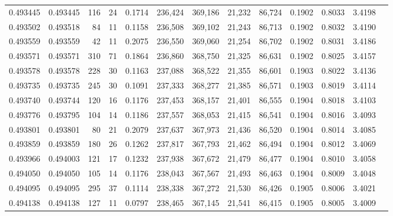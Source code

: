 \begin{tabular}{rrrrrrrrrrrrr}
0.493445 & 0.493445 &   116 &    24 &                                     0.1714 & 236,424 & 369,186 &  21,232 &  86,724 & 0.1902 & 0.8033 & 3.4198 \\
0.493502 & 0.493518 &    84 &    11 &                                     0.1158 & 236,508 & 369,102 &  21,243 &  86,713 & 0.1902 & 0.8032 & 3.4190 \\
0.493559 & 0.493559 &    42 &    11 &                                     0.2075 & 236,550 & 369,060 &  21,254 &  86,702 & 0.1902 & 0.8031 & 3.4186 \\
0.493571 & 0.493571 &   310 &    71 &                                     0.1864 & 236,860 & 368,750 &  21,325 &  86,631 & 0.1902 & 0.8025 & 3.4157 \\
0.493578 & 0.493578 &   228 &    30 &                                     0.1163 & 237,088 & 368,522 &  21,355 &  86,601 & 0.1903 & 0.8022 & 3.4136 \\
0.493735 & 0.493735 &   245 &    30 &                                     0.1091 & 237,333 & 368,277 &  21,385 &  86,571 & 0.1903 & 0.8019 & 3.4114 \\
0.493740 & 0.493744 &   120 &    16 &                                     0.1176 & 237,453 & 368,157 &  21,401 &  86,555 & 0.1904 & 0.8018 & 3.4103 \\
0.493776 & 0.493795 &   104 &    14 &                                     0.1186 & 237,557 & 368,053 &  21,415 &  86,541 & 0.1904 & 0.8016 & 3.4093 \\
0.493801 & 0.493801 &    80 &    21 &                                     0.2079 & 237,637 & 367,973 &  21,436 &  86,520 & 0.1904 & 0.8014 & 3.4085 \\
0.493859 & 0.493859 &   180 &    26 &                                     0.1262 & 237,817 & 367,793 &  21,462 &  86,494 & 0.1904 & 0.8012 & 3.4069 \\
0.493966 & 0.494003 &   121 &    17 &                                     0.1232 & 237,938 & 367,672 &  21,479 &  86,477 & 0.1904 & 0.8010 & 3.4058 \\
0.494050 & 0.494050 &   105 &    14 &                                     0.1176 & 238,043 & 367,567 &  21,493 &  86,463 & 0.1904 & 0.8009 & 3.4048 \\
0.494095 & 0.494095 &   295 &    37 &                                     0.1114 & 238,338 & 367,272 &  21,530 &  86,426 & 0.1905 & 0.8006 & 3.4021 \\
0.494138 & 0.494138 &   127 &    11 &                                     0.0797 & 238,465 & 367,145 &  21,541 &  86,415 & 0.1905 & 0.8005 & 3.4009 \\

\end{tabular}
